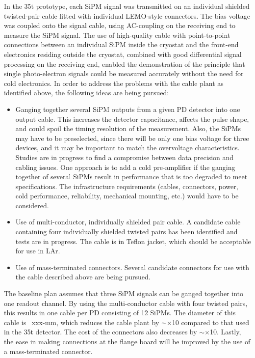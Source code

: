 In the 35t prototype, each SiPM signal was  transmitted on an
individual shielded twisted-pair cable fitted with individual
LEMO-style connectors.  The bias voltage was coupled onto the signal
cable, using AC-coupling on the receiving end to measure the SiPM
signal.  The use of high-quality cable with point-to-point connections
between an individual SiPM inside the cryostat and the front-end
electronics residing outside the cryostat, combined with good
differential signal processing on the receiving end, enabled the
demonstration of the principle that single photo-electron signals
could be measured accurately without the need for cold electronics.
In order to address the problems with the cable plant as identified
above, the following ideas are being pursued:
\begin{itemize}
\item Ganging together several SiPM outputs from a given PD
  detector into one output cable.  This increases the detector
  capacitance, affects the pulse shape, and could spoil the timing
  resolution of the measurement.  Also, the SiPMs may have to be
  preselected, since there will be only one bias voltage for three
  devices, and it may be important to match the overvoltage
  characteristics.  Studies are in progress to find a compromise
  between data precision and cabling issues. One approach is to add a
  cold pre-amplifier if the ganging together of several SiPMs result
  in performance that is too degraded to meet specifications.  The
  infrastructure requirements (cables, connectors, power, cold
  performance, reliability, mechanical mounting, etc.) would have to
  be considered.

\item Use of multi-conductor, individually shielded pair  cable.  A
  candidate cable containing four individually shielded twisted pairs
  has been identified and tests are in progress.  The cable is in
  Teflon jacket, which should be  acceptable for use in LAr.

\item Use of mass-terminated connectors.  Several candidate connectors
  for use with the cable described above are being pursued.
\end{itemize}

The baseline  \fixme{} plan assumes that three SiPM signals  can be ganged
together into one readout channel.  By using the multi-conductor cable
with four twisted pairs, this results in one cable per PD consisting
of 12 SiPMs.  The diameter of this cable is ~xxx-mm,  which reduces the
cable plant by $\sim \times$10 compared to that used in the 35t
detector.  The cost of the connectors also decreases by $\sim \times$10.
Lastly, the ease in making connections at the flange board will be
improved by the use of a mass-terminated connector.

